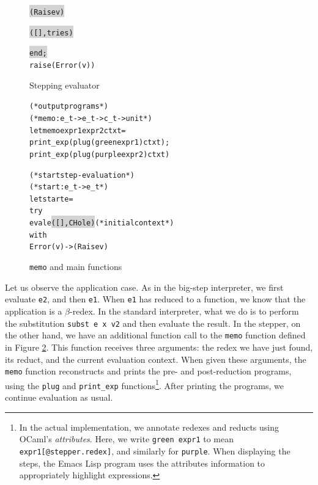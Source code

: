 \begin{figure}
\begin{alltt}
\end{alltt}
\vspace{-18pt}
\begin{alltt}
    \colorbox{lightgray}{           (Raise v)                    }
\end{alltt}
\vspace{-18pt}
\begin{alltt}
    \colorbox{lightgray}{           ([], tries)                  }
\end{alltt}
\vspace{-18pt}
\begin{alltt}
    \colorbox{lightgray}{end;                                    }
    raise (Error (v))
\end{alltt}
\caption{Stepping evaluator}
\label{figure:stepper}
\end{figure}

\begin{figure}
\begin{alltt}
(* output programs *)
(* memo : e_t -> e_t -> c_t -> unit *)
let memo expr1 expr2 ctxt =
  print_exp (plug (green expr1) ctxt);
  print_exp (plug (purple expr2) ctxt)

(* start step-evaluation *)
(* start : e_t -> e_t *)
let start e =
  try
    eval e \colorbox{lightgray}{([], CHole)}    (* initial context *)
  with
    Error (v) -> (Raise v)
\end{alltt}
\caption{\texttt{memo} and main functions}
\label{figure:memo}
\end{figure}

Let us observe the application case.  As in the big-step interpreter, we first evaluate \texttt{e2}, and then \texttt{e1}.  When \texttt{e1} has reduced to a function, we know that the application is a $\beta$-redex.  In the standard interpreter, what we do is to perform the substitution \texttt{subst e x v2} and then evaluate the result.  In the stepper, on the other hand, we have an additional function call to the \texttt{memo} function defined in Figure \ref{figure:memo}.  This function receives three arguments: the redex we have just found, its reduct, and the current evaluation context.  When given these arguments, the \texttt{memo} function reconstructs and prints the pre- and post-reduction programs, using the \texttt{plug} and \texttt{print\_exp} functions\footnote{In the actual implementation, we annotate redexes and reducts using OCaml's \emph{attributes}.  Here, we write \texttt{green expr1} to mean \texttt{expr1[@stepper.redex]}, and similarly for \texttt{purple}.  When displaying the steps, the Emacs Lisp program uses the attributes information to appropriately highlight expressions.}.  After printing the programs, we continue evaluation as usual.

